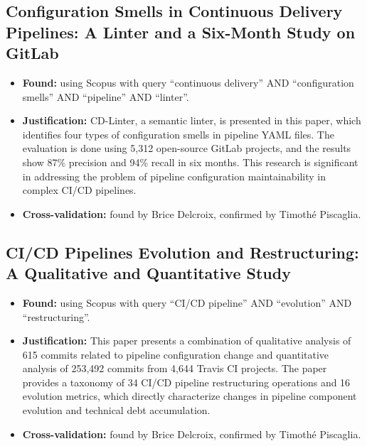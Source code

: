 \documentclass[a4paper,11pt,oneside]{article}
\begin{document}
\subsection{Configuration Smells in Continuous Delivery Pipelines: A Linter and a Six-Month Study on GitLab \cite{Vassallo2020}}
%
\begin{itemize}
    \item \textbf{Found:} using Scopus with query ``continuous delivery'' AND ``configuration smells'' AND ``pipeline'' AND ``linter''.
    \item \textbf{Justification:} CD-Linter, a semantic linter, is presented in this paper, which identifies four types of configuration smells in pipeline YAML files. The evaluation is done using 5,312 open-source GitLab projects, and the results show 87\% precision and 94\% recall in six months. This research is significant in addressing the problem of pipeline configuration maintainability in complex CI/CD pipelines.
    \item \textbf{Cross-validation:} found by Brice Delcroix, confirmed by Timoth\'{e} Piscaglia.
\end{itemize}

\subsection{CI/CD Pipelines Evolution and Restructuring: A Qualitative and Quantitative Study \cite{Zampetti2021}}
%
\begin{itemize}
    \item \textbf{Found:} using Scopus with query ``CI/CD pipeline'' AND ``evolution'' AND ``restructuring''.
    \item \textbf{Justification:} This paper presents a combination of qualitative analysis of 615 commits related to pipeline configuration change and quantitative analysis of 253,492 commits from 4,644 Travis CI projects. The paper provides a taxonomy of 34 CI/CD pipeline restructuring operations and 16 evolution metrics, which directly characterize changes in pipeline component evolution and technical debt accumulation.
    \item \textbf{Cross-validation:} found by Brice Delcroix, confirmed by Timoth\'{e} Piscaglia.
\end{itemize}

\end{document}
